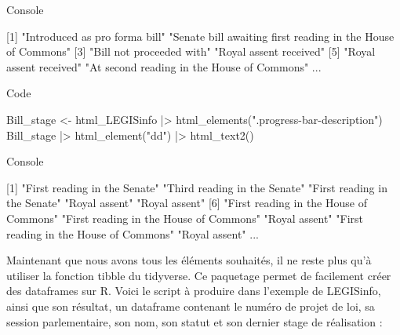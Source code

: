 \documentclass[
  letterpaper,
  DIV=11,
  numbers=noendperiod]{scrreprt}
\newenvironment{Shaded}{\begin{snugshade}}{\end{snugshade}}
\newcommand{\ExtensionTok}[1]{\textcolor[rgb]{0.00,0.23,0.31}{#1}}
\newcommand{\KeywordTok}[1]{\textcolor[rgb]{0.00,0.23,0.31}{#1}}
\newcommand{\NormalTok}[1]{\textcolor[rgb]{0.00,0.23,0.31}{#1}}
\newcommand{\OperatorTok}[1]{\textcolor[rgb]{0.37,0.37,0.37}{#1}}
\newcommand{\StringTok}[1]{\textcolor[rgb]{0.13,0.47,0.30}{#1}}
\begin{document}
Console

\begin{Shaded}
\begin{Highlighting}[]
\ExtensionTok{[1]} \StringTok{"Introduced as pro forma bill"}                                 
\StringTok{"Senate bill awaiting first reading in the House of Commons"}               
 \ExtensionTok{[3]} \StringTok{"Bill not proceeded with"}                                              
 \StringTok{"Royal assent received"}                                                    
 \ExtensionTok{[5]} \StringTok{"Royal assent received"}                                                 
 \StringTok{"At second reading in the House of Commons"}     
\ExtensionTok{...}
\end{Highlighting}
\end{Shaded}

Code

\begin{Shaded}
\begin{Highlighting}[]
\ExtensionTok{Bill\_stage} \OperatorTok{\textless{}}\NormalTok{{-} html\_LEGISinfo }\KeywordTok{|}\OperatorTok{\textgreater{}}\NormalTok{ html\_elements}\KeywordTok{(}\StringTok{".progress{-}bar{-}description"}\KeywordTok{)}
\ExtensionTok{Bill\_stage} \KeywordTok{|}\OperatorTok{\textgreater{}}\NormalTok{ html\_element}\KeywordTok{(}\StringTok{"dd"}\KeywordTok{)} \KeywordTok{|}\OperatorTok{\textgreater{}}\NormalTok{ html\_text2}\KeywordTok{()}
\end{Highlighting}
\end{Shaded}

Console

\begin{Shaded}
\begin{Highlighting}[]
\ExtensionTok{[1]} \StringTok{"First reading in the Senate"}            
\StringTok{"Third reading in the Senate"}            
\StringTok{"First reading in the Senate"}           
\StringTok{"Royal assent"}                        
\StringTok{"Royal assent"}                          
 \ExtensionTok{[6]} \StringTok{"First reading in the House of Commons"} 
 \StringTok{"First reading in the House of }
\StringTok{ Commons"}  \StringTok{"Royal assent"}                          
 \StringTok{"First reading in the House of Commons"}  \StringTok{"Royal assent"}        
\ExtensionTok{...}
 
\end{Highlighting}
\end{Shaded}

Maintenant que nous avons tous les éléments souhaités, il ne reste plus
qu'à utiliser la fonction tibble du tidyverse. Ce paquetage permet de
facilement créer des dataframes sur R. Voici le script à produire dans
l'exemple de LEGISinfo, ainsi que son résultat, un dataframe contenant
le numéro de projet de loi, sa session parlementaire, son nom, son
statut et son dernier stage de réalisation :
\end{document}
